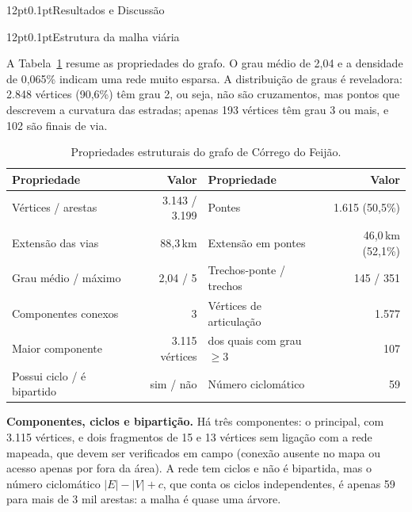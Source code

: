 \documentclass[12pt,a4paper]{article}
\makeatletter
\renewcommand\section{\@startsection{section}{1}{\z@}%
  {12pt}{0.1pt}{\normalfont\fontsize{13}{15}\selectfont\bfseries}}
\renewcommand\subsection{\@startsection{subsection}{2}{\z@}%
  {12pt}{0.1pt}{\normalfont\normalsize\bfseries}}
\makeatother
\begin{document}
\section{Resultados e Discussão}

\subsection{Estrutura da malha viária}

A Tabela~\ref{tab:estrutura} resume as propriedades do grafo. O grau médio de 2,04 e a densidade de 0,065\% indicam uma rede muito esparsa. A distribuição de graus é reveladora: 2.848 vértices (90,6\%) têm grau 2, ou seja, não são cruzamentos, mas pontos que descrevem a curvatura das estradas; apenas 193 vértices têm grau 3 ou mais, e 102 são finais de via.

\begin{table}[!htb]
\caption{Propriedades estruturais do grafo de Córrego do Feijão.}
\label{tab:estrutura}
\centering\small
\begin{tabular}{@{}lr@{\hspace{0.6cm}}lr@{}}
\toprule
\textbf{Propriedade} & \textbf{Valor} & \textbf{Propriedade} & \textbf{Valor}\\
\midrule
Vértices / arestas & 3.143 / 3.199 & Pontes & 1.615 (50,5\%)\\
Extensão das vias & 88,3\,km & Extensão em pontes & 46,0\,km (52,1\%)\\
Grau médio / máximo & 2,04 / 5 & Trechos-ponte / trechos & 145 / 351\\
Componentes conexos & 3 & Vértices de articulação & 1.577\\
Maior componente & 3.115 vértices & \quad dos quais com grau $\ge 3$ & 107\\
Possui ciclo / é bipartido & sim / não & Número ciclomático & 59\\
\bottomrule
\end{tabular}
\end{table}

\textbf{Componentes, ciclos e bipartição.} Há três componentes: o principal, com 3.115 vértices, e dois fragmentos de 15 e 13 vértices sem ligação com a rede mapeada, que devem ser verificados em campo (conexão ausente no mapa ou acesso apenas por fora da área). A rede tem ciclos e não é bipartida, mas o número ciclomático $|E|-|V|+c$, que conta os ciclos independentes, é apenas 59 para mais de 3 mil arestas: a malha é quase uma árvore.
\end{document}
